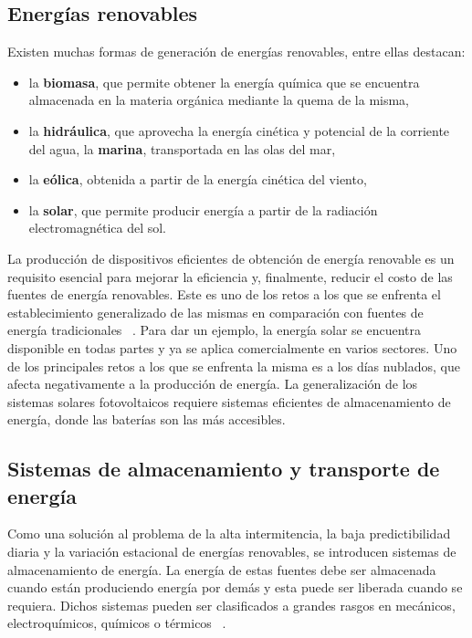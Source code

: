 \subsection{Energías renovables}

Existen muchas formas de generación de energías renovables, entre ellas destacan:
\begin{itemize}
    \item la \textbf{biomasa}, que permite obtener la energía química 
        que se encuentra almacenada en la materia orgánica mediante la quema de 
        la misma,
    \item la \textbf{hidráulica}, que aprovecha la energía cinética y potencial
        de la corriente del agua, la \textbf{marina}, transportada en las olas
        del mar,
    \item la \textbf{eólica}, obtenida a partir de la energía cinética del viento,
    \item la \textbf{solar}, que permite producir energía a partir de la radiación
        electromagnética del sol.
\end{itemize}
La producción de dispositivos eficientes de obtención de energía renovable es un 
requisito esencial para mejorar la eficiencia y, finalmente, reducir el costo de 
las fuentes de energía renovables. Este es uno de los retos a los que se 
enfrenta el establecimiento generalizado de las mismas en comparación con fuentes
de energía tradicionales ~\cite{olabi2022}. Para dar un ejemplo, la energía solar 
se encuentra disponible en todas partes y ya se aplica comercialmente en varios 
sectores. Uno de los principales retos a los que se enfrenta la misma es a los 
días nublados, que afecta negativamente a la producción de energía. La 
generalización de los sistemas solares fotovoltaicos requiere sistemas eficientes 
de almacenamiento de energía, donde las baterías son las más accesibles. 

\subsection{Sistemas de almacenamiento y transporte de energía}

Como una solución al problema de la alta intermitencia, la baja predictibilidad 
diaria y la variación estacional de energías renovables, se introducen sistemas 
de almacenamiento de energía. La energía de estas fuentes debe ser almacenada 
cuando están produciendo energía por demás y esta puede ser liberada cuando se 
requiera. Dichos sistemas pueden ser clasificados a grandes rasgos en mecánicos, 
electroquímicos, químicos o térmicos ~\cite{khan2019}.

